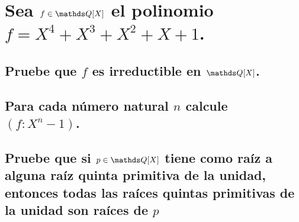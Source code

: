 \documentclass[a4paper,spanish]{article}
\begin{document}
\section{%
Sea $f \in \Q[X]$ el polinomio $f = X^4 + X^3 + X^2 + X + 1$.%
}
  \subsection{%
    Pruebe que $f$ es irreductible en $\Q[X]$.%
  }

  \subsection{%
    Para cada número natural $n$ calcule $(f:X^n-1)$.%
  }
  
  \subsection{%
    Pruebe que si $p \in \Q[X]$ tiene como raíz a alguna raíz quinta %
    primitiva de la unidad, entonces todas las raíces quintas primitivas %
    de la unidad son raíces de $p$%
  }
\end{document}
